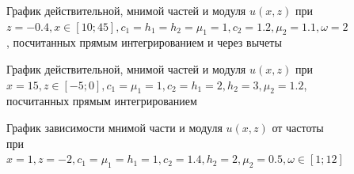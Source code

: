 \documentclass[a4paper, 12pt]{article}
\begin{document}
\begin{figure}[h!]
\noindent{}
\caption{График действительной, мнимой частей и модуля $u(x,z)$ при $z=-0.4, x \in [10;45], c_1=h_1=h_2=\mu_1=1, c_2=1.2,\mu_2=1.1,\omega=2$, посчитанных прямым интегрированием и через вычеты}
\label{figCurves}
\end{figure}

\begin{figure}[h!]
\noindent{}
\caption{График действительной, мнимой частей и модуля $u(x,z)$ при $x=15, z \in [-5;0], c_1=\mu_1=1, c_2=h_1=2, h_2=3, \mu_2=1.2$, посчитанных прямым интегрированием}
\label{figCurves}
\end{figure}

\begin{figure}[h!]
\noindent{}
            \caption{График зависимости мнимой части и модуля $u(x,z)$ от частоты при $x=1, z=-2, c_1=\mu_1=h_1=1, c_2=1.4, h_2=2, \mu_2=0.5, \omega \in [1;12]$}
            \label{figCurves}
            \end{figure}  
            
\end{document}
